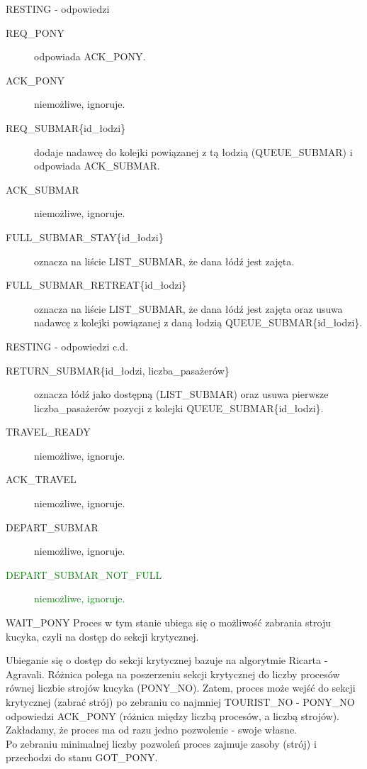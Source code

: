 \documentclass{beamer}
\begin{document}
\begin{frame}{RESTING - odpowiedzi}
    \internallinenumbers
    \resetlinenumber[1]
    \begin{description}
        \item [REQ\_PONY] odpowiada ACK\_PONY.
        \item [ACK\_PONY] niemożliwe, ignoruje.
        \item [REQ\_SUBMAR\{id\_łodzi\}] dodaje nadawcę do kolejki powiązanej z tą łodzią (QUEUE\_SUBMAR) i odpowiada ACK\_SUBMAR.
        \item [ACK\_SUBMAR] niemożliwe, ignoruje.
        \item [FULL\_SUBMAR\_STAY\{id\_łodzi\}] oznacza na liście LIST\_SUBMAR, że dana łódź jest zajęta.
        \item [FULL\_SUBMAR\_RETREAT\{id\_łodzi\}] oznacza na liście LIST\_SUBMAR, że dana łódź jest zajęta oraz usuwa nadawcę z kolejki powiązanej z daną łodzią QUEUE\_SUBMAR\{id\_łodzi\}.
    \end{description}
\end{frame}

\begin{frame}{RESTING - odpowiedzi c.d.}
    \internallinenumbers
    \resetlinenumber[1]
    \begin{description}
        \item [RETURN\_SUBMAR\{id\_łodzi, liczba\_pasażerów\}] oznacza łódź jako dostępną (LIST\_SUBMAR) oraz usuwa pierwsze liczba\_pasażerów pozycji z kolejki QUEUE\_SUBMAR\{id\_łodzi\}.
        \item [TRAVEL\_READY] niemożliwe, ignoruje.
        \item [ACK\_TRAVEL] niemożliwe, ignoruje.
        \item [DEPART\_SUBMAR] niemożliwe, ignoruje.
        \item [\textcolor{green}{DEPART\_SUBMAR\_NOT\_FULL}] \textcolor{green}{niemożliwe, ignoruje.}
    \end{description}
\end{frame}

\begin{frame}{WAIT\_PONY}
    \internallinenumbers
    \resetlinenumber[1]
    Proces w tym stanie ubiega się o  możliwość zabrania stroju kucyka, czyli na dostęp do sekcji krytycznej.

    \vspace{0.4cm}
    Ubieganie się o dostęp do sekcji krytycznej bazuje na algorytmie Ricarta - Agravali. Różnica polega na poszerzeniu sekcji krytycznej do liczby procesów równej liczbie strojów kucyka (PONY\_NO). Zatem, proces może wejść do sekcji krytycznej (zabrać strój) po zebraniu co najmniej TOURIST\_NO - PONY\_NO odpowiedzi ACK\_PONY (różnica między liczbą procesów, a liczbą strojów). Zakładamy, że proces ma od razu jedno pozwolenie - swoje własne. \\
    Po zebraniu minimalnej liczby pozwoleń proces zajmuje zasoby (strój) i przechodzi do stanu GOT\_PONY.
\end{frame}
\end{document}
